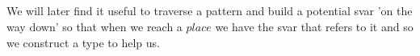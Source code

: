 {\begin{code}
\\
\>[0]\AgdaSpace{}%
\AgdaSpace{}%
%
\>[14]\AgdaSymbol{=}\AgdaSpace{}%
\AgdaSpace{}%
\AgdaSymbol{(}\AgdaSpace{}%
\AgdaSymbol{)}\<%
\\
\>[0]\AgdaSpace{}%
\AgdaSpace{}%
%
\>[14]\AgdaSymbol{=}\AgdaSpace{}%
\AgdaSpace{}%
\AgdaSymbol{(}\AgdaSpace{}%
\AgdaSymbol{)}\<%
\\
\>[0]\AgdaSpace{}%
%
\>[14]\AgdaSymbol{=}\AgdaSpace{}%
\<%
\\
%
\\[\AgdaEmptyExtraSkip]%
\>[0]\AgdaSpace{}%
\AgdaSymbol{:}\AgdaSpace{}%
\AgdaSpace{}%
\AgdaSpace{}%
\AgdaSpace{}%
\AgdaSpace{}%
\AgdaSpace{}%
\AgdaSymbol{(}\AgdaSpace{}%
\AgdaSymbol{)}\AgdaSpace{}%
\<%
\\
\>[0]\AgdaSpace{}%
\AgdaSpace{}%
\AgdaSymbol{=}\AgdaSpace{}%
\<%
\\
\>[0]\AgdaSymbol{(}\AgdaSpace{}%
\AgdaSymbol{)}\AgdaSpace{}%
\AgdaSpace{}%
\AgdaSymbol{=}\AgdaSpace{}%
\AgdaSymbol{(}\AgdaSpace{}%
\AgdaSymbol{)}\AgdaSpace{}%
\<%
\\
\>[0]\AgdaSymbol{(}\AgdaSpace{}%
\AgdaSymbol{)}\AgdaSpace{}%
\AgdaSpace{}%
\AgdaSymbol{=}\AgdaSpace{}%
\AgdaSpace{}%
\AgdaSymbol{(}\AgdaSpace{}%
\AgdaSymbol{)}\<%
\\
\>[0]\AgdaSpace{}%
\AgdaSpace{}%
\AgdaSpace{}%
\AgdaSymbol{=}\AgdaSpace{}%
\AgdaSpace{}%
\AgdaSymbol{(}\AgdaSpace{}%
\AgdaSymbol{)}\<%
\end{code}
}
We will later find it useful to traverse a pattern and build a potential svar
'on the way down' so that when we reach a $place$ we have the svar
that refers to it and so we construct a type to help us.

